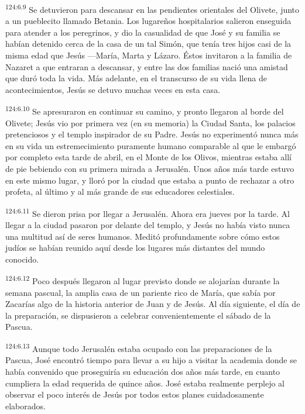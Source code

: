 \par
\textsuperscript{124:6.9} Se detuvieron para descansar en las pendientes orientales del Olivete, junto a un pueblecito llamado Betania. Los lugareños hospitalarios salieron enseguida para atender a los peregrinos, y dio la casualidad de que José y su familia se habían detenido cerca de la casa de un tal Simón, que tenía tres hijos casi de la misma edad que Jesús ---María, Marta y Lázaro. Éstos invitaron a la familia de Nazaret a que entraran a descansar, y entre las dos familias nació una amistad que duró toda la vida. Más adelante, en el transcurso de su vida llena de acontecimientos, Jesús se detuvo muchas veces en esta casa.

\par
\textsuperscript{124:6.10} Se apresuraron en continuar su camino, y pronto llegaron al borde del Olivete; Jesús vio por primera vez (en su memoria) la Ciudad Santa, los palacios pretenciosos y el templo inspirador de su Padre. Jesús no experimentó nunca más en su vida un estremecimiento puramente humano comparable al que le embargó por completo esta tarde de abril, en el Monte de los Olivos, mientras estaba allí de pie bebiendo con su primera mirada a Jerusalén. Unos años más tarde estuvo en este mismo lugar, y lloró por la ciudad que estaba a punto de rechazar a otro profeta, al último y al más grande de sus educadores celestiales.

\par
\textsuperscript{124:6.11} Se dieron prisa por llegar a Jerusalén. Ahora era jueves por la tarde. Al llegar a la ciudad pasaron por delante del templo, y Jesús no había visto nunca una multitud así de seres humanos. Meditó profundamente sobre cómo estos judíos se habían reunido aquí desde los lugares más distantes del mundo conocido.

\par
\textsuperscript{124:6.12} Poco después llegaron al lugar previsto donde se alojarían durante la semana pascual, la amplia casa de un pariente rico de María, que sabía por Zacarías algo de la historia anterior de Juan y de Jesús. Al día siguiente, el día de la preparación, se dispusieron a celebrar convenientemente el sábado de la Pascua.

\par
\textsuperscript{124:6.13} Aunque todo Jerusalén estaba ocupado con las preparaciones de la Pascua, José encontró tiempo para llevar a su hijo a visitar la academia donde se había convenido que proseguiría su educación dos años más tarde, en cuanto cumpliera la edad requerida de quince años. José estaba realmente perplejo al observar el poco interés de Jesús por todos estos planes cuidadosamente elaborados.

